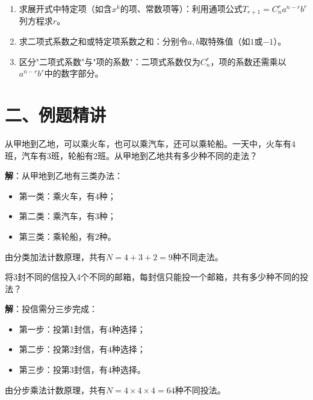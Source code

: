 \documentclass[12pt, a4paper]{ctexart}
\begin{document}
\begin{warnbox}[二项式定理常见考点]
\begin{enumerate}[label=\arabic*.]
  \item 求展开式中特定项（如含$x^k$的项、常数项等）：利用通项公式$T_{r+1} = C_n^r a^{n-r} b^r$列方程求$r$。
  \item 求二项式系数之和或特定项系数之和：分别令$a, b$取特殊值（如$1$或$-1$）。
  \item 区分"二项式系数"与"项的系数"：二项式系数仅为$C_n^r$，项的系数还需乘以$a^{n-r} b^r$中的数字部分。
\end{enumerate}
\end{warnbox}

\vspace{8pt}
\section*{\textcolor{examorange}{二、例题精讲}}

\begin{examplebox}[【例题1】分类加法与分步乘法计数原理]
从甲地到乙地，可以乘火车，也可以乘汽车，还可以乘轮船。一天中，火车有4班，汽车有3班，轮船有2班。从甲地到乙地共有多少种不同的走法？

\textbf{解}：从甲地到乙地有三类办法：
\begin{itemize}
  \item 第一类：乘火车，有$4$种；
  \item 第二类：乘汽车，有$3$种；
  \item 第三类：乘轮船，有$2$种。
\end{itemize}
由分类加法计数原理，共有$N = 4 + 3 + 2 = 9$种不同走法。
\end{examplebox}

\begin{examplebox}[【例题2】分步乘法计数原理的应用]
将3封不同的信投入4个不同的邮箱，每封信只能投一个邮箱，共有多少种不同的投法？

\textbf{解}：投信需分三步完成：
\begin{itemize}
  \item 第一步：投第1封信，有$4$种选择；
  \item 第二步：投第2封信，有$4$种选择；
  \item 第三步：投第3封信，有$4$种选择。
\end{itemize}
由分步乘法计数原理，共有$N = 4 \times 4 \times 4 = 64$种不同投法。
\end{examplebox}
\end{document}
